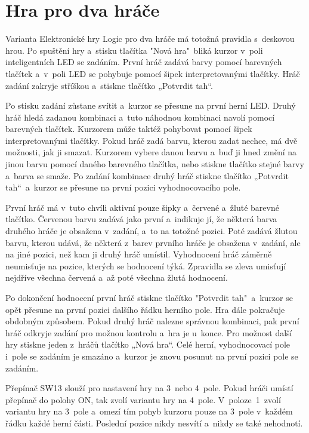 \newpage
\section{Hra pro dva hráče}
Varianta Elektronické hry Logic pro dva hráče má totožná pravidla s~deskovou hrou. Po spuštění hry a~stisku tlačítka "Nová hra"\ bliká 
kurzor v~poli inteligentních LED se zadáním. První hráč zadává barvy pomocí barevných tlačítek a~v~poli LED se pohybuje pomocí šipek 
interpretovanými tlačítky. Hráč zadání zakryje stříškou a~stiskne tlačítko „Potvrdit tah“. 

Po stisku zadání zůstane svítit a~kurzor se přesune na první herní LED. Druhý hráč hledá zadanou kombinaci a~tuto náhodnou kombinaci 
navolí pomocí barevných tlačítek. Kurzorem může taktéž pohybovat pomocí šipek interpretovanými tlačítky.
Pokud hráč zadá barvu, kterou zadat nechce, má dvě možnosti,
jak ji smazat. Kurzorem vybere danou barvu a~buď ji hned změní na jinou barvu pomocí daného barevného tlačítka, nebo stiskne tlačítko 
stejné barvy a~barva se smaže. Po zadání kombinace 
druhý hráč stiskne tlačítko „Potvrdit tah“\  a~kurzor se přesune na první pozici vyhodnocovacího pole. 

První hráč má v~tuto chvíli aktivní pouze šipky a~červené a~žluté barevné tlačítko. Červenou barvu zadává jako první a~indikuje jí, že 
některá barva druhého hráče je obsažena v~zadání, a~to na totožné pozici. Poté zadává žlutou barvu, kterou 
udává, že některá z~barev prvního hráče je obsažena v~zadání, ale na jiné pozici, než kam ji druhý hráč umístil. Vyhodnocení 
hráč záměrně neumisťuje na pozice, kterých se hodnocení týká. Zpravidla se zleva umisťují nejdříve všechna červená a~až poté 
všechna žlutá hodnocení. 

Po dokončení hodnocení první hráč stiskne tlačítko "Potvrdit tah"\  a~kurzor se opět přesune na první pozici dalšího řádku herního pole. 
Hra dále pokračuje obdobným způsobem.
Pokud druhý hráč nalezne správnou kombinaci, pak první hráč odkryje zadání pro možnou kontrolu a~hra je u~konce. Pro možnost další 
hry stiskne jeden z~hráčů tlačítko „Nová hra“. Celé herní, vyhodnocovací pole i~pole se zadáním je smazáno a~kurzor je znovu posunut 
na první pozici pole se zadáním. 

Přepínač SW13 slouží pro nastavení hry na 3~nebo 4~pole. Pokud hráči umístí přepínač do polohy ON, tak zvolí variantu hry na 4~pole. 
V~poloze~1~zvolí variantu hry na 3~pole a~omezí tím pohyb kurzoru pouze na 3~pole v~každém řádku každé herní části. Poslední pozice
nikdy nesvítí a~nikdy se také nehodnotí. 

